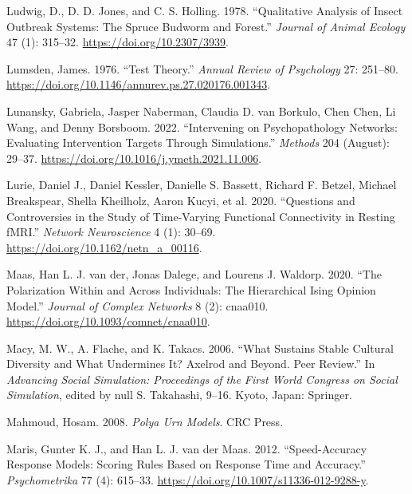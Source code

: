 \documentclass[
  a4paper,
  DIV=11,
  numbers=noendperiod,
  oneside]{scrreprt}
\newlength{\cslhangindent}
\newenvironment{CSLReferences}[2] %
 {\begin{list}{}{%
  \setlength{\itemindent}{0pt}
  \setlength{\leftmargin}{0pt}
  \setlength{\parsep}{0pt}
  \ifodd #1
   \setlength{\leftmargin}{\cslhangindent}
   \setlength{\itemindent}{-1\cslhangindent}
  \fi
  \setlength{\itemsep}{#2\baselineskip}}}
 {\end{list}}
\begin{document}
\begin{CSLReferences}{1}{0}
Ludwig, D., D. D. Jones, and C. S. Holling. 1978. {``Qualitative
Analysis of Insect Outbreak Systems: The Spruce Budworm and Forest.''}
\emph{Journal of Animal Ecology} 47 (1): 315--32.
\url{https://doi.org/10.2307/3939}.

Lumsden, James. 1976. {``Test Theory.''} \emph{Annual Review of
Psychology} 27: 251--80.
\url{https://doi.org/10.1146/annurev.ps.27.020176.001343}.

Lunansky, Gabriela, Jasper Naberman, Claudia D. van Borkulo, Chen Chen,
Li Wang, and Denny Borsboom. 2022. {``Intervening on Psychopathology
Networks: {Evaluating} Intervention Targets Through Simulations.''}
\emph{Methods} 204 (August): 29--37.
\url{https://doi.org/10.1016/j.ymeth.2021.11.006}.

Lurie, Daniel J., Daniel Kessler, Danielle S. Bassett, Richard F.
Betzel, Michael Breakspear, Shella Kheilholz, Aaron Kucyi, et al. 2020.
{``Questions and Controversies in the Study of Time-Varying Functional
Connectivity in Resting {fMRI}.''} \emph{Network Neuroscience} 4 (1):
30--69. \url{https://doi.org/10.1162/netn_a_00116}.

Maas, Han L. J. van der, Jonas Dalege, and Lourens J. Waldorp. 2020.
{``The Polarization Within and Across Individuals: The Hierarchical
Ising Opinion Model.''} \emph{Journal of Complex Networks} 8 (2):
cnaa010. \url{https://doi.org/10.1093/comnet/cnaa010}.

Macy, M. W., A. Flache, and K. Takacs. 2006. {``What {Sustains Stable
Cultural Diversity} and {What Undermines It}? {Axelrod} and Beyond.
{Peer} Review.''} In \emph{Advancing {Social Simulation}: {Proceedings}
of the {First World Congress} on {Social Simulation}}, edited by null S.
Takahashi, 9--16. {Kyoto, Japan}: {Springer}.

Mahmoud, Hosam. 2008. \emph{Polya {Urn Models}}. {CRC Press}.

Maris, Gunter K. J., and Han L. J. van der Maas. 2012. {``Speed-Accuracy
Response Models: {Scoring} Rules Based on Response Time and Accuracy.''}
\emph{Psychometrika} 77 (4): 615--33.
\url{https://doi.org/10.1007/s11336-012-9288-y}.


\end{CSLReferences}
\end{document}
